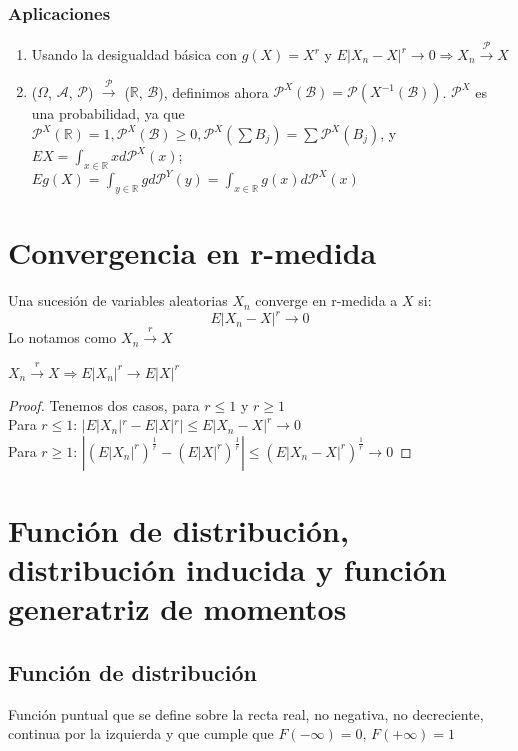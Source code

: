 \subsubsection{Aplicaciones}
\begin{enumerate}
\item Usando la desigualdad básica con $g(X) = X^r$ y $E|X_n - X|^r \to 0 \Rightarrow X_n \stackrel{\mathcal{P}}{\rightarrow} X$
\item ($\Omega$, $\mathcal{A}$, $\mathcal{P}$) $\stackrel{\mathcal{P}}{\rightarrow}$ ($\mathbb{R}$, $\mathcal{B}$), definimos ahora $\mathcal{P}^X(\mathcal{B}) = \mathcal{P}(X^{-1}(\mathcal{B}))$. $\mathcal{P}^X$ es una probabilidad, ya que $\mathcal{P}^X(\mathbb{R}) = 1, \mathcal{P}^X(\mathcal{B}) \geq 0, \mathcal{P}^X(\sum B_j) = \sum \mathcal{P}^X(B_j)$, y $EX = \displaystyle \int_{x \in \mathbb{R}} x d \mathcal{P}^X(x)$; $Eg(X) = \displaystyle \int_{y \in \mathbb{R}} g d \mathcal{P}^Y(y) = \displaystyle \int_{x \in \mathbb{R}} g(x) d \mathcal{P}^X(x)$
\end{enumerate}

\section{Convergencia en r-medida}
Una sucesión de variables aleatorias $X_n$ converge en r-medida a $X$ si:
$$ E|X_n - X|^r \to 0$$
Lo notamos como $X_n \stackrel{r}{\rightarrow} X$

\begin{lemma}
$X_n \stackrel{r}{\rightarrow} X \Rightarrow E|X_n|^r \rightarrow E|X|^r$
\end{lemma}

\begin{proof}
Tenemos dos casos, para $r \leq 1$ y $r \geq 1$\\

Para $r \leq 1$: $|E|X_n|^r - E|X|^r| \leq E|X_n - X|^r \rightarrow 0$\\

Para $r \geq 1$: $|(E|X_n|^r)^{\frac{1}{r}} - (E|X|^r)^{\frac{1}{r}}| \leq (E|X_n - X|^r)^{\frac{1}{r}} \rightarrow 0$
\end{proof}

\section{Función de distribución, distribución inducida y función generatriz de momentos}
\subsection{Función de distribución}
Función puntual que se define sobre la recta real, no negativa, no decreciente, continua por la izquierda y que cumple que $F(-\infty) = 0$, $F(+\infty) = 1$\\

